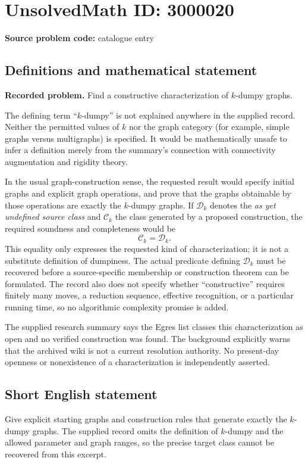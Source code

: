 \documentclass[11pt]{article}
\begin{document}
\section*{UnsolvedMath ID: 3000020}
\textbf{Source problem code:} catalogue entry
\subsection{Definitions and mathematical statement}
\textbf{Recorded problem.} Find a constructive characterization of $k$-dumpy graphs.

The defining term ``$k$-dumpy'' is not explained anywhere in the supplied record. Neither the permitted values of $k$ nor the graph category (for example, simple graphs versus multigraphs) is specified. It would be mathematically unsafe to infer a definition merely from the summary's connection with connectivity augmentation and rigidity theory.

In the usual graph-construction sense, the requested result would specify initial graphs and explicit graph operations, and prove that the graphs obtainable by those operations are exactly the $k$-dumpy graphs. If $\mathcal D_k$ denotes the \emph{as yet undefined source class} and $\mathcal C_k$ the class generated by a proposed construction, the required soundness and completeness would be
\[
 \mathcal C_k=\mathcal D_k.
\]
This equality only expresses the requested kind of characterization; it is not a substitute definition of dumpiness. The actual predicate defining $\mathcal D_k$ must be recovered before a source-specific membership or construction theorem can be formulated. The record also does not specify whether ``constructive'' requires finitely many moves, a reduction sequence, effective recognition, or a particular running time, so no algorithmic complexity promise is added.

The supplied research summary says the Egres list classes this characterization as open and no verified construction was found. The background explicitly warns that the archived wiki is not a current resolution authority. No present-day openness or nonexistence of a characterization is independently asserted.
\subsection{Short English statement}
Give explicit starting graphs and construction rules that generate exactly the $k$-dumpy graphs. The supplied record omits the definition of $k$-dumpy and the allowed parameter and graph ranges, so the precise target class cannot be recovered from this excerpt.
\end{document}
